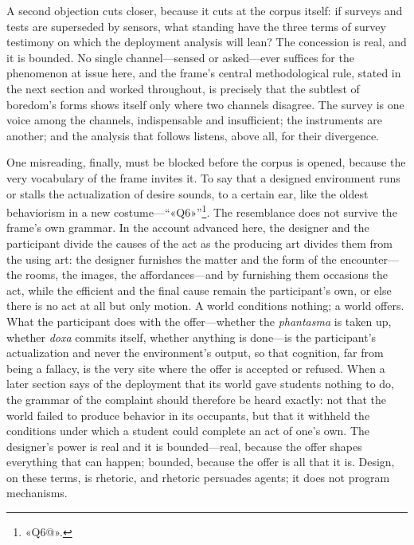 A second objection cuts closer, because it cuts at the corpus itself: if surveys and tests are superseded by sensors, what standing have the three terms of survey testimony on which the deployment analysis will lean? The concession is real, and it is bounded. No single channel---sensed or asked---ever suffices for the phenomenon at issue here, and the frame's central methodological rule, stated in the next section and worked throughout, is precisely that the subtlest of boredom's forms shows itself only where two channels disagree. The survey is one voice among the channels, indispensable and insufficient; the instruments are another; and the analysis that follows listens, above all, for their divergence.

One misreading, finally, must be blocked before the corpus is opened, because the very vocabulary of the frame invites it. To say that a designed environment runs or stalls the actualization of desire sounds, to a certain ear, like the oldest behaviorism in a new costume---``«Q6»''\footnote{«Q6@».}. The resemblance does not survive the frame's own grammar. In the account advanced here, the designer and the participant divide the causes of the act as the producing art divides them from the using art: the designer furnishes the matter and the form of the encounter---the rooms, the images, the affordances---and by furnishing them occasions the act, while the efficient and the final cause remain the participant's own, or else there is no act at all but only motion. A world conditions nothing; a world offers. What the participant does with the offer---whether the \textit{phantasma} is taken up, whether \textit{doxa} commits itself, whether anything is done---is the participant's actualization and never the environment's output, so that cognition, far from being a fallacy, is the very site where the offer is accepted or refused. When a later section says of the deployment that its world gave students nothing to do, the grammar of the complaint should therefore be heard exactly: not that the world failed to produce behavior in its occupants, but that it withheld the conditions under which a student could complete an act of one's own. The designer's power is real and it is bounded---real, because the offer shapes everything that can happen; bounded, because the offer is all that it is. Design, on these terms, is rhetoric, and rhetoric persuades agents; it does not program mechanisms.


